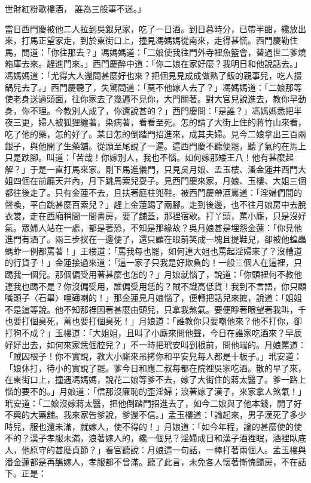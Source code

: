 世財紅粉歌樓酒，  誰為三般事不迷。」

當日西門慶被他二人拉到吳銀兒家，吃了一日酒。到日暮時分，已帶半酣，纔放出來，打馬正望家走，到於東街口上，撞見馮媽媽從南來，走得甚慌。西門慶勒住馬，問道：「你往那去？」馮媽媽道：「二娘使我往門外寺裡魚籃會，替過世二爹燒箱庫去來。趕進門來。」西門慶醉中道：「你二娘在家好麼？我明日和他說話去。」馮媽媽道：「尤得大人還問甚麼好也來？把個見見成成做熟了飯的親事兒，吃人掇鍋兒去了。」西門慶聽了，失驚問道：「莫不他嫁人去了？」馮媽媽道：「二娘那等使老身送過頭面，往你家去了幾遍不見你，大門關著。對大官兒說進去，教你早動身，你不理。今教別人成了，你還說甚的？」西門慶問：「是誰？」馮媽媽悉把半夜三更，婦人被狐狸纏著，染病著，看看至死。怎的請了大街上住的蔣竹山來看，吃了他的藥，怎的好了。某日怎的倒踏門招進來，成其夫婦。見今二娘拿出三百兩銀子，與他開了生藥舖。從頭至尾說了一遍。這西門慶不聽便罷，聽了氣的在馬上只是跌腳。叫道：「苦哉！你嫁別人，我也不惱。如何嫁那矮王八！他有甚麼起解？」于是一直打馬來家。剛下馬進儀門，只見吳月娘、孟玉樓、潘金蓮并西門大姐四個在前廳天井內，月下跳馬索兒耍子。見西門慶來家，月娘、玉樓、大姐三個都往後走了。只有金蓮不去，且扶著庭柱兜鞋。被西門慶帶酒罵道：「淫婦們間的聲喚，平白跳甚麼百索兒？」趕上金蓮踢了兩腳。走到後邊，也不往月娘房中去脫衣裳，走在西廂稍間一間書房，要了舖蓋，那裡宿歇。打丫頭，罵小廝，只是沒好氣。眾婦人站在一處，都是著恐，不知是那緣故？吳月娘甚是埋怨金蓮：「你見他進門有酒了。兩三步扠在一邊便了，還只顧在眼前笑成一塊且提鞋兒，卻被他蝗蟲螞蚱一例都罵著！」王樓道：「罵我每也罷，如何連大姐也罵起淫婦來了？沒槽道的行貨子！」金蓮接過來道：「這一家子只我是好欺負的！一般三個人在這裡，只踢我一個兒。那個偏受用著甚麼也怎的？」月娘就惱了，說道：「你頭裡何不教他連我也踢不是？你沒偏受用，誰偏受用恁的？賊不識高低貨！我到不言語，你只顧嘴頭子〈石畢〉哩礡喇的！」那金蓮見月娘惱了，便轉把話兒來摭，說道：「姐姐不是這等說。他不知那裡因著甚麼由頭兒，只拿我煞氣。要便睜著眼望著我叫，千也要打個臭死，萬也要打個臭死！」月娘道：「誰教你只要嘲他來？他不打你，卻打狗不成？」玉樓道：「大姐姐，且叫了小廝來問他聲，今日在誰家吃酒來？早辰好好出去，如何來家恁個腔兒？」不一時把玳安叫到根前，問他端的。月娘罵道：「賊囚根子！你不實說，教大小廝來吊拷你和平安兒每人都是十板子。」玳安道：「娘休打，待小的實說了罷。爹今日和應二叔每都在院裡吳家吃酒。散的早了來，在東街口上，撞遇馮媽媽，說花二娘等爹不去，嫁了大街住的蔣太醫了。爹一路上惱的要不的。」月娘道：「信那沒廉恥的歪淫婦；浪著嫁了漢子，來家拿人煞氣！」玳安道：「二娘沒嫁蔣太醫，把他倒踏門招進去了，如今二娘與了他本錢，開了好不興的大藥舖。我來家告爹說，爹還不信。」孟玉樓道：「論起來，男子漢死了多少時兒，服也還未滿，就嫁人，使不得的！」月娘道：「如今年程，論的甚麼使的使不的？漢子孝服未滿，浪著嫁人的，纔一個兒？淫婦成日和漢子酒裡眠，酒裡臥底人，他原守的甚麼貞節？」看官聽說：月娘這一句話，一棒打著兩個人。孟玉樓與潘金蓮都是再醮嫁人，孝服都不曾滿。聽了此言，未免各人懷著慚愧歸房，不在話下。正是：

